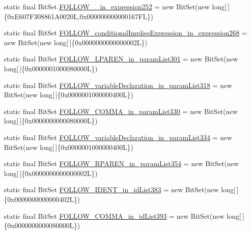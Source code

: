 \begin{DoxyCompactItemize}
\item 
static final Bit\-Set \hyperlink{classorg_1_1tzi_1_1use_1_1parser_1_1ocl_1_1_o_c_l_parser_ab62f558908408ff419051c88a81c854b}{F\-O\-L\-L\-O\-W\-\_\-\_\-in\-\_\-expression252} = new Bit\-Set(new long\mbox{[}$\,$\mbox{]}\{0x\-E607\-F308861\-A0020\-L,0x000000000000167\-F\-L\})
\item 
static final Bit\-Set \hyperlink{classorg_1_1tzi_1_1use_1_1parser_1_1ocl_1_1_o_c_l_parser_a3484306ed96df560ae3ab017eaab8a7e}{F\-O\-L\-L\-O\-W\-\_\-conditional\-Implies\-Expression\-\_\-in\-\_\-expression268} = new Bit\-Set(new long\mbox{[}$\,$\mbox{]}\{0x0000000000000002\-L\})
\item 
static final Bit\-Set \hyperlink{classorg_1_1tzi_1_1use_1_1parser_1_1ocl_1_1_o_c_l_parser_ac5c634e02757e7f2411af2803573c55c}{F\-O\-L\-L\-O\-W\-\_\-\-L\-P\-A\-R\-E\-N\-\_\-in\-\_\-param\-List301} = new Bit\-Set(new long\mbox{[}$\,$\mbox{]}\{0x0000001000080000\-L\})
\item 
static final Bit\-Set \hyperlink{classorg_1_1tzi_1_1use_1_1parser_1_1ocl_1_1_o_c_l_parser_aaf7e6b6ae68e3f5d095e6c0d2af3cd31}{F\-O\-L\-L\-O\-W\-\_\-variable\-Declaration\-\_\-in\-\_\-param\-List318} = new Bit\-Set(new long\mbox{[}$\,$\mbox{]}\{0x0000001000000400\-L\})
\item 
static final Bit\-Set \hyperlink{classorg_1_1tzi_1_1use_1_1parser_1_1ocl_1_1_o_c_l_parser_a21cd57b4ab6c25091158118d7550b6ad}{F\-O\-L\-L\-O\-W\-\_\-\-C\-O\-M\-M\-A\-\_\-in\-\_\-param\-List330} = new Bit\-Set(new long\mbox{[}$\,$\mbox{]}\{0x0000000000080000\-L\})
\item 
static final Bit\-Set \hyperlink{classorg_1_1tzi_1_1use_1_1parser_1_1ocl_1_1_o_c_l_parser_a8e91a1e1bc79a0cd077ac323d139fb63}{F\-O\-L\-L\-O\-W\-\_\-variable\-Declaration\-\_\-in\-\_\-param\-List334} = new Bit\-Set(new long\mbox{[}$\,$\mbox{]}\{0x0000001000000400\-L\})
\item 
static final Bit\-Set \hyperlink{classorg_1_1tzi_1_1use_1_1parser_1_1ocl_1_1_o_c_l_parser_a44f5caf7690298aaf9c7c27b6dc396f1}{F\-O\-L\-L\-O\-W\-\_\-\-R\-P\-A\-R\-E\-N\-\_\-in\-\_\-param\-List354} = new Bit\-Set(new long\mbox{[}$\,$\mbox{]}\{0x0000000000000002\-L\})
\item 
static final Bit\-Set \hyperlink{classorg_1_1tzi_1_1use_1_1parser_1_1ocl_1_1_o_c_l_parser_a0013dea7e792922b78472c8017b46d40}{F\-O\-L\-L\-O\-W\-\_\-\-I\-D\-E\-N\-T\-\_\-in\-\_\-id\-List383} = new Bit\-Set(new long\mbox{[}$\,$\mbox{]}\{0x0000000000000402\-L\})
\item 
static final Bit\-Set \hyperlink{classorg_1_1tzi_1_1use_1_1parser_1_1ocl_1_1_o_c_l_parser_afff022955d33a5b6aa68836a8ed4ba03}{F\-O\-L\-L\-O\-W\-\_\-\-C\-O\-M\-M\-A\-\_\-in\-\_\-id\-List393} = new Bit\-Set(new long\mbox{[}$\,$\mbox{]}\{0x0000000000080000\-L\})

\end{DoxyCompactItemize}
